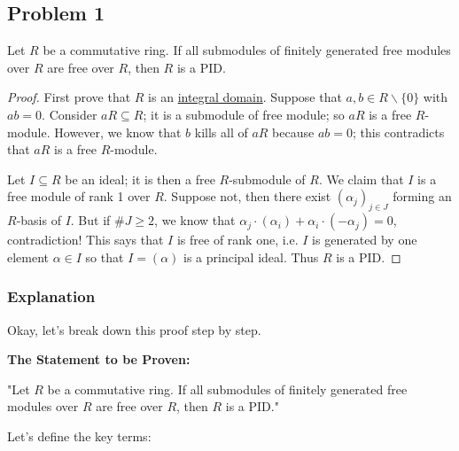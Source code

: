 \subsection{Problem 1}

\begin{theorem}
Let $R$ be a commutative ring. If all submodules of finitely generated free modules over $R$ are free over $R$, then $R$ is a PID.
\end{theorem}
\begin{proof}
First prove that $R$ is an \underline{integral domain}. Suppose that $a, b \in R \backslash\{0\}$ with $a b=0$. Consider $a R \subseteq R$; it is a submodule of free module; so $a R$ is a free $R$-module. However, we know that $b$ kills all of $a R$ because $a b=0$; this contradicts that $a R$ is a free $R$-module.

Let $I \subseteq R$ be an ideal; it is then a free $R$-submodule of $R$. We claim that $I$ is a free module of rank 1 over $R$. Suppose not, then there exist $\left(\alpha_j\right)_{j \in J}$ forming an $R$-basis of $I$. But if $\# J \geq 2$, we know that $\alpha_j \cdot\left(\alpha_i\right)+\alpha_i \cdot\left(-\alpha_j\right)=0$, contradiction! This says that $I$ is free of rank one, i.e. $I$ is generated by one element $\alpha \in I$ so that $I=(\alpha)$ is a principal ideal. Thus $R$ is a PID.
\end{proof}

\subsubsection{Explanation}

Okay, let's break down this proof step by step.

\textbf{The Statement to be Proven:}

"Let $R$ be a commutative ring. If all submodules of finitely generated free modules over $R$ are free over $R$, then $R$ is a PID."

Let's define the key terms:

